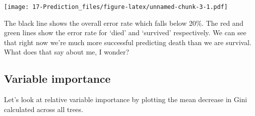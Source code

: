 \documentclass[]{book}
\newenvironment{Shaded}{\begin{snugshade}}{\end{snugshade}}
\newcommand{\KeywordTok}[1]{\textcolor[rgb]{0.13,0.29,0.53}{\textbf{#1}}}
\newcommand{\DataTypeTok}[1]{\textcolor[rgb]{0.13,0.29,0.53}{#1}}
\newcommand{\DecValTok}[1]{\textcolor[rgb]{0.00,0.00,0.81}{#1}}
\newcommand{\FloatTok}[1]{\textcolor[rgb]{0.00,0.00,0.81}{#1}}
\newcommand{\StringTok}[1]{\textcolor[rgb]{0.31,0.60,0.02}{#1}}
\newcommand{\CommentTok}[1]{\textcolor[rgb]{0.56,0.35,0.01}{\textit{#1}}}
\newcommand{\OperatorTok}[1]{\textcolor[rgb]{0.81,0.36,0.00}{\textbf{#1}}}
\newcommand{\NormalTok}[1]{#1}
\theoremstyle{definition}
\theoremstyle{definition}
\theoremstyle{definition}
\theoremstyle{remark}
\begin{document}
\begin{Shaded}
\end{Shaded}

\texttt{[image: 17-Prediction\_files/figure-latex/unnamed-chunk-3-1.pdf]}

The black line shows the overall error rate which falls below 20\%. The
red and green lines show the error rate for `died' and `survived'
respectively. We can see that right now we're much more successful
predicting death than we are survival. What does that say about me, I
wonder?

\subsection{Variable importance}\label{variable-importance}

Let's look at relative variable importance by plotting the mean decrease
in Gini calculated across all trees.
\end{document}
